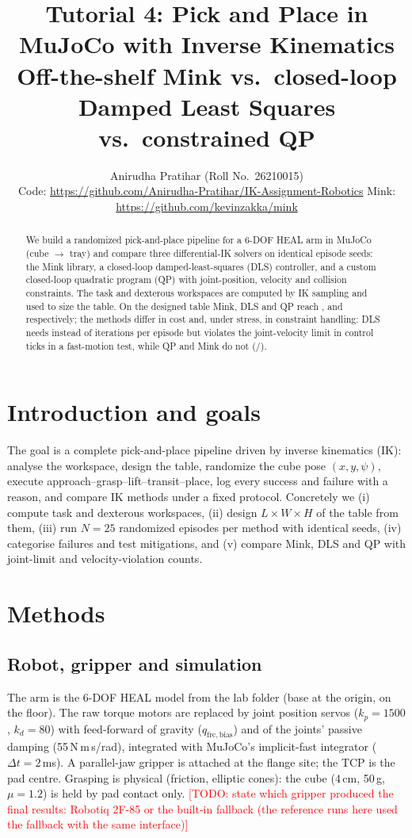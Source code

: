 \documentclass[10pt,a4paper]{article}
\title{\vspace{-1.2cm}\textbf{Tutorial 4: Pick and Place in MuJoCo with Inverse Kinematics}\\[2pt]
\large Off-the-shelf Mink vs.\ closed-loop Damped Least Squares vs.\ constrained QP}
\author{Anirudha Pratihar (Roll No.\ 26210015) \\ \small Code: \url{https://github.com/Anirudha-Pratihar/IK-Assignment-Robotics} \quad Mink: \url{https://github.com/kevinzakka/mink}}
\date{}
\newcommand{\todo}[1]{\textcolor{red}{[TODO: #1]}}
\begin{document}
\maketitle\vspace{-0.9cm}

\begin{abstract}\noindent
We build a randomized pick-and-place pipeline for a 6-DOF HEAL arm in MuJoCo (cube $\to$ tray) and compare three differential-IK
solvers on identical episode seeds: the Mink library, a closed-loop damped-least-squares (DLS) controller, and a custom closed-loop
quadratic program (QP) with joint-position, velocity and collision constraints. The task and dexterous workspaces are computed by IK
sampling and used to size the table. On the designed table Mink, DLS and QP reach \mainSuccMink{}, \mainSuccDLS{} and \mainSuccQP{} respectively; the methods differ in cost and, under
stress, in constraint handling: DLS needs \mainIterDLS{} instead of \mainIterQP{} iterations per episode but violates the
joint-velocity limit in \fastVelDLS{} control ticks in a fast-motion test, while QP and Mink do not (\fastVelMink{}/\fastVelQP{}).
\end{abstract}

\section{Introduction and goals}
The goal is a complete pick-and-place pipeline driven by inverse kinematics (IK): analyse the workspace, design the table, randomize
the cube pose $(x,y,\psi)$, execute approach--grasp--lift--transit--place, log every success and failure with a reason, and compare
IK methods under a fixed protocol. Concretely we (i) compute task and dexterous workspaces, (ii) design $L\times W\times H$ of the
table from them, (iii) run $N{=}25$ randomized episodes per method with identical seeds, (iv) categorise failures and test mitigations,
and (v) compare Mink, DLS and QP with joint-limit and velocity-violation counts.

\section{Methods}
\subsection{Robot, gripper and simulation}
The arm is the 6-DOF HEAL model from the lab folder (base at the origin, on the floor). The raw torque motors are replaced by joint
position servos ($k_p{=}1500$, $k_d{=}80$) with feed-forward of gravity ($q_{\mathrm{frc,bias}}$) and of the joints' passive damping
(55\,N\,m\,s/rad), integrated with MuJoCo's implicit-fast integrator ($\Delta t{=}2$\,ms). A parallel-jaw gripper is attached at the
flange site; the TCP is the pad centre. Grasping is physical (friction, elliptic cones): the cube (4\,cm, 50\,g, $\mu{=}1.2$) is held by pad
contact only. \todo{state which gripper produced the final results: Robotiq 2F-85 or the built-in fallback (the reference runs here used the fallback with the same interface)}
\end{document}
